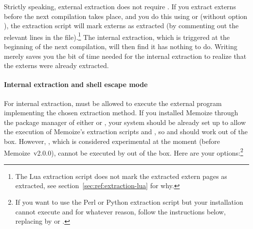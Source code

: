\documentclass[a4paper,11pt]{article}
\begin{document}
Strictly speaking, external extraction does not require
.  If you extract externs before the
next compilation takes place, and you do this using
 or  (without
option ), the extraction script will mark
externs as extracted (by commenting out the relevant lines in the \dmmz
file).\footnote{The Lua extraction script does not mark the extracted extern
  pages as extracted, see section~\ref{sec:ref:extraction-lua} for why.} The
internal extraction, which is triggered at the beginning of the next
compilation, will then find it has nothing to do.  Writing
 merely saves you the bit of time
needed for the internal extraction to realize that the externs were already
extracted.

\paragraph{Internal extraction and shell escape mode}

For internal extraction,  must be allowed to execute the external
program implementing the chosen extraction method.  If you installed Memoize
through the package manager of either \TeXLive or \MiKTeX, your system should
be already set up to allow the execution of Memoize's extraction scripts
 and , so
 and
 should work out of the box.
However, , which is considered experimental at
the moment (before Memoize~v2.0.0), cannot be executed by  out of
the box. Here are your options:\footnote{If you want to use the Perl or Python
  extraction script but your  installation cannot execute
   and  for
  whatever reason, follow the instructions below, replacing  by
   or .}
\end{document}
